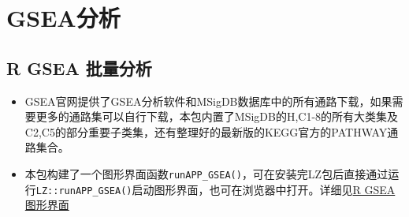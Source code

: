 \documentclass[
]{book}
\begin{document}
\section{GSEA分析}\label{enrich-gsea}

\subsection{R GSEA 批量分析}\label{r-gsea-ux6279ux91cfux5206ux6790}

\begin{itemize}
\item
  GSEA官网提供了GSEA分析软件和MSigDB数据库中的所有通路下载，如果需要更多的通路集可以自行下载，本包内置了MSigDB的H,C1-8的所有大类集及C2,C5的部分重要子类集，还有整理好的最新版的KEGG官方的PATHWAY通路集合。
\item
  本包构建了一个图形界面函数\texttt{runAPP\_GSEA()}，可在安装完LZ包后直接通过运行\texttt{LZ::runAPP\_GSEA()}启动图形界面，也可在浏览器中打开。详细见\hyperref[enrich-gsea-r.gsea.gui]{R GSEA 图形界面}
\end{itemize}
\end{document}
